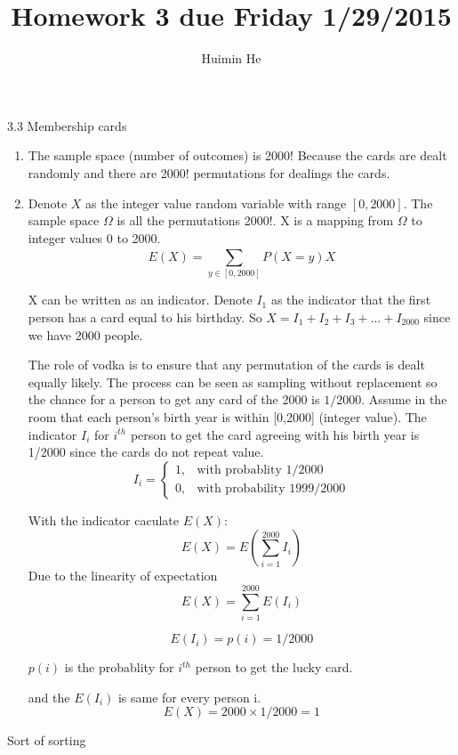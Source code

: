 \documentclass[a4paper]{article}
\title{Homework 3 due Friday 1/29/2015}
\author{Huimin He}
\begin{document}
\maketitle

3.3 Membership cards
\begin{enumerate}
\begin{enumerate}
\item
The sample space (number of outcomes) is 2000! Because the cards are dealt randomly and there are 2000! permutations for dealings the cards.

\item
Denote $X$ as the integer value random variable with range $[0,2000]$. The sample space $\Omega$ is all the permutations 2000!. X is a mapping from $\Omega$ to integer values 0 to 2000.
\[
E(X) = \sum_{y \in [0,2000]}^{}P(X=y)X
\]

X can be written as an indicator.
Denote $I_{1}$ as the indicator that the first person has a card equal to his birthday.
So $X = I_{1} + I_{2} + I_{3} + ... + I_{2000}$ since we have 2000 people. 

The role of vodka is to ensure that any permutation of the cards is dealt equally likely. The process can be seen as sampling without replacement so the chance for a person to get any card of the 2000 is $1/2000$. Assume in the room that each person's birth year is within [0,2000] (integer value). The indicator $I_{i}$ for $i^{th}$ person to get the card agreeing with his birth year is 1/2000 since the cards do not repeat value. \\

\[I_{i}=\begin{cases} 1, & \mbox{with probablity 1/2000 }  \\ 0, & \mbox{with probability 1999/2000} \end{cases}
\]

With the indicator caculate $E(X)$: 
\[
E(X) = E(\sum_{i=1}^{2000}I_{i}) 
\]
Due to the linearity of expectation
\[
E(X) = \sum_{i=1}^{2000}E(I_{i})
\]

\[
E(I_{i}) = p(i) = 1/2000
\]

$p(i)$ is the probablity for $i^{th}$ person to get the lucky card.

and the $E(I_{i})$ is same for every person i.
\[
E(X) = 2000 \times 1/2000 = 1
\]
\end{enumerate}
\end{enumerate}

 Sort of sorting
\end{document}
